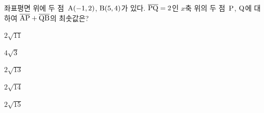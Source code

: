 좌표평면 위에 두 점~$\mathrm{A}(-1{,}\mkern3mu 2)$, $\mathrm{B}(5{,}\mkern3mu 4)$가 있다. $\overline{\mathrm{PQ}}=2$인 $x$축 위의 두 점~$\mathrm{P}$, $\mathrm{Q}$에 대하여 $\overline{\mathrm{AP}}+\overline{\mathrm{QB}}$의 최솟값은? 
\begin{choices32}{\rule[-3ex]{0pt}{8ex}$2\sqrt{11}$}{\rule[-3ex]{0pt}{8ex}$4\sqrt{3}$}{\rule[-3ex]{0pt}{8ex}$2\sqrt{13}$}{\rule[-3ex]{0pt}{8ex}$2\sqrt{14}$}{\rule[-3ex]{0pt}{8ex}$2\sqrt{15}$}\end{choices32}
